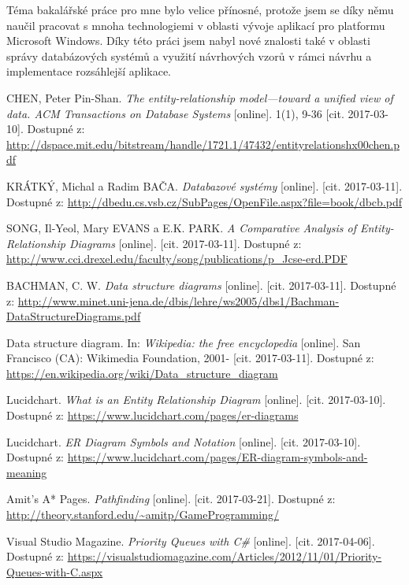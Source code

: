 \documentclass[czech,bachelor,public,dept460,male,oneside]{diploma}
\begin{document}
Téma bakalářské práce pro mne bylo velice přínosné, protože jsem se díky němu naučil pracovat s mnoha technologiemi v oblasti vývoje aplikací pro platformu Microsoft Windows. Díky této práci jsem nabyl nové znalosti také v oblasti správy databázových systémů a využití návrhových vzorů v rámci návrhu a implementace rozsáhlejší aplikace.

\newpage
\begin{thebibliography}{99}
	 CHEN, Peter Pin-Shan. \textit{The entity-relationship model---toward a unified view of data. ACM Transactions on Database Systems} [online]. 1(1), 9-36 [cit. 2017-03-10]. Dostupné z: \url{http://dspace.mit.edu/bitstream/handle/1721.1/47432/entityrelationshx00chen.pdf}
	
	 KRÁTKÝ, Michal a Radim BAČA. \textit{Databazové systémy} [online]. [cit. 2017-03-11]. Dostupné z: \url{http://dbedu.cs.vsb.cz/SubPages/OpenFile.aspx?file=book/dbcb.pdf}
	
	 SONG, Il-Yeol, Mary EVANS a E.K. PARK. \textit{A Comparative Analysis of Entity-Relationship Diagrams} [online]. [cit. 2017-03-11]. Dostupné z: \url{http://www.cci.drexel.edu/faculty/song/publications/p_Jcse-erd.PDF}
	
	 BACHMAN, C. W. \textit{Data structure diagrams} [online]. [cit. 2017-03-11]. Dostupné z: \url{http://www.minet.uni-jena.de/dbis/lehre/ws2005/dbs1/Bachman-DataStructureDiagrams.pdf}
	
	 Data structure diagram. In: \textit{Wikipedia: the free encyclopedia} [online]. San Francisco (CA): Wikimedia Foundation, 2001- [cit. 2017-03-11]. Dostupné z: \url{https://en.wikipedia.org/wiki/Data_structure_diagram}
	
	Lucidchart. \textit{What is an Entity Relationship Diagram} [online]. [cit. 2017-03-10]. Dostupné z: \url{https://www.lucidchart.com/pages/er-diagrams}
	
	Lucidchart. \textit{ER Diagram Symbols and Notation} [online]. [cit. 2017-03-10]. Dostupné z: \url{https://www.lucidchart.com/pages/ER-diagram-symbols-and-meaning}
	
	Amit’s A* Pages. \textit{Pathfinding} [online]. [cit. 2017-03-21]. Dostupné z: \url{http://theory.stanford.edu/~amitp/GameProgramming/}
	
	Visual Studio Magazine. \textit{Priority Queues with C\#} [online]. [cit. 2017-04-06]. Dostupné z: \url{https://visualstudiomagazine.com/Articles/2012/11/01/Priority-Queues-with-C.aspx}
	
	
\end{thebibliography}
\end{document}
